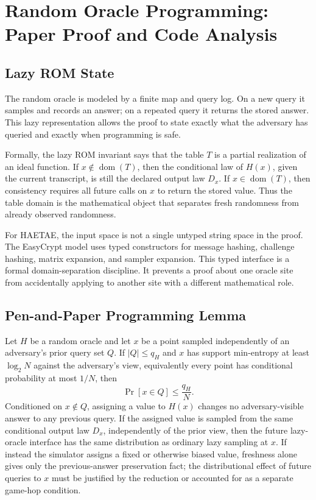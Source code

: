 \chapter{Random Oracle Programming: Paper Proof and Code Analysis}
\label{ch:rom-programming}

\section{Lazy ROM State}

The random oracle is modeled by a finite map and query log.  On a new query it
samples and records an answer; on a repeated query it returns the stored answer.
This lazy representation allows the proof to state exactly what the adversary
has queried and exactly when programming is safe.

Formally, the lazy ROM invariant says that the table \(T\) is a partial
realization of an ideal function.  If \(x\notin\operatorname{dom}(T)\), then the
conditional law of \(H(x)\), given the current transcript, is still the declared
output law \(D_x\).  If \(x\in\operatorname{dom}(T)\), then consistency requires
all future calls on \(x\) to return the stored value.  Thus the table domain is
the mathematical object that separates fresh randomness from already observed
randomness.

For HAETAE, the input space is not a single untyped string space in the proof.
The EasyCrypt model uses typed constructors for message hashing, challenge
hashing, matrix expansion, and sampler expansion.  This typed interface is a
formal domain-separation discipline.  It prevents a proof about one oracle site
from accidentally applying to another site with a different mathematical role.

\section{Pen-and-Paper Programming Lemma}

\begin{lemma}
Let \(H\) be a random oracle and let \(x\) be a point sampled independently of
an adversary's prior query set \(Q\).  If \(|Q|\le q_H\) and \(x\) has support
min-entropy at least \(\log_2 N\) against the adversary's view, equivalently
every point has conditional probability at most \(1/N\), then
\[
\Pr[x\in Q] \le \frac{q_H}{N}.
\]
Conditioned on \(x\notin Q\), assigning a value to \(H(x)\) changes no
adversary-visible answer to any previous query.  If the assigned value is sampled
from the same conditional output law \(D_x\), independently of the prior view,
then the future lazy-oracle interface has the same distribution as ordinary lazy
sampling at \(x\).  If instead the simulator assigns a fixed or otherwise
biased value, freshness alone gives only the previous-answer preservation fact;
the distributional effect of future queries to \(x\) must be justified by the
reduction or accounted for as a separate game-hop condition.
\end{lemma}

